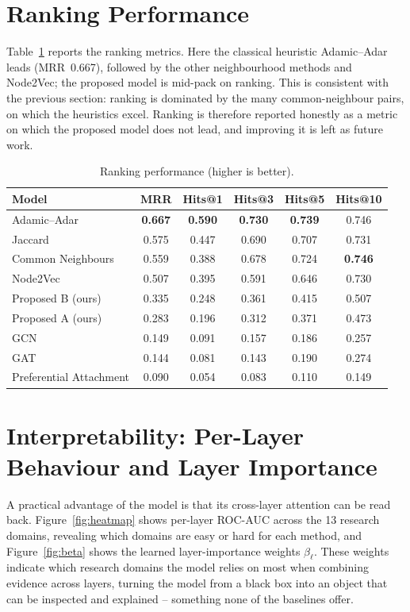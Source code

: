 \section{Ranking Performance}
Table~\ref{tab:ranking} reports the ranking metrics. Here the classical heuristic Adamic--Adar leads
(MRR~0.667), followed by the other neighbourhood methods and Node2Vec; the proposed model is mid-pack
on ranking. This is consistent with the previous section: ranking is dominated by the many
common-neighbour pairs, on which the heuristics excel. Ranking is therefore reported honestly as a
metric on which the proposed model does not lead, and improving it is left as future work.

\begin{table}[htbp]
\centering
\caption{Ranking performance (higher is better).}
\label{tab:ranking}
\renewcommand{\arraystretch}{1.25}
\begin{tabular}{lccccc}
\toprule
\textbf{Model} & \textbf{MRR} & \textbf{Hits@1} & \textbf{Hits@3} & \textbf{Hits@5} & \textbf{Hits@10} \\
\midrule
Adamic--Adar        & \textbf{0.667} & \textbf{0.590} & \textbf{0.730} & \textbf{0.739} & 0.746 \\
Jaccard             & 0.575 & 0.447 & 0.690 & 0.707 & 0.731 \\
Common Neighbours   & 0.559 & 0.388 & 0.678 & 0.724 & \textbf{0.746} \\
Node2Vec            & 0.507 & 0.395 & 0.591 & 0.646 & 0.730 \\
Proposed B (ours)   & 0.335 & 0.248 & 0.361 & 0.415 & 0.507 \\
Proposed A (ours)   & 0.283 & 0.196 & 0.312 & 0.371 & 0.473 \\
GCN                 & 0.149 & 0.091 & 0.157 & 0.186 & 0.257 \\
GAT                 & 0.144 & 0.081 & 0.143 & 0.190 & 0.274 \\
Preferential Attachment & 0.090 & 0.054 & 0.083 & 0.110 & 0.149 \\
\bottomrule
\end{tabular}
\end{table}

\section{Interpretability: Per-Layer Behaviour and Layer Importance}
A practical advantage of the model is that its cross-layer attention can be read back.
Figure~\ref{fig:heatmap} shows per-layer ROC-AUC across the 13 research domains, revealing which
domains are easy or hard for each method, and Figure~\ref{fig:beta} shows the learned
layer-importance weights $\beta_\ell$. These weights indicate which research domains the model relies
on most when combining evidence across layers, turning the model from a black box into an object that
can be inspected and explained -- something none of the baselines offer.

